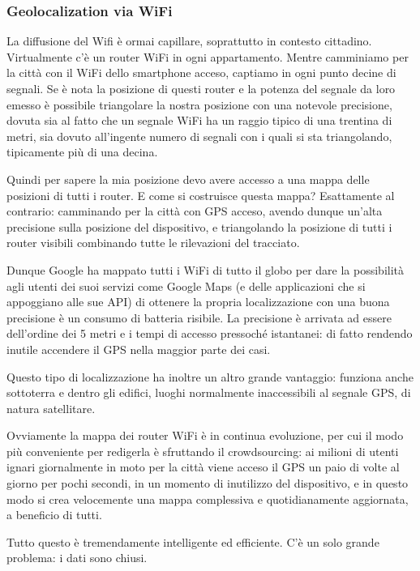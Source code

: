 \subsubsection*{Geolocalization via WiFi}
La diffusione del Wifi è ormai capillare, soprattutto in contesto cittadino. Virtualmente c'è un router WiFi in ogni appartamento. Mentre camminiamo per la città con il WiFi dello smartphone acceso, captiamo in ogni punto decine di segnali. Se è nota la posizione di questi router e la potenza del segnale da loro emesso è possibile triangolare la nostra posizione con una notevole precisione, dovuta sia al fatto che un segnale WiFi ha un raggio tipico di una trentina di metri, sia dovuto all'ingente numero di segnali con i quali si sta triangolando, tipicamente più di una decina.

Quindi per sapere la mia posizione devo avere accesso a una mappa delle posizioni di tutti i router. E come si costruisce questa mappa? Esattamente al contrario: camminando per la città con GPS acceso, avendo dunque un'alta precisione sulla posizione del dispositivo, e triangolando la posizione di tutti i router visibili combinando tutte le rilevazioni del tracciato.

Dunque Google ha mappato tutti i WiFi di tutto il globo per dare la possibilità agli utenti dei suoi servizi come Google Maps (e delle applicazioni che si appoggiano alle sue API) di ottenere la propria localizzazione con una buona precisione è un consumo di batteria risibile. La precisione è arrivata ad essere dell'ordine dei 5 metri e i tempi di accesso pressoché istantanei: di fatto rendendo inutile accendere il GPS nella maggior parte dei casi.

Questo tipo di localizzazione ha inoltre un altro grande vantaggio: funziona anche sottoterra e dentro gli edifici, luoghi normalmente inaccessibili al segnale GPS, di natura satellitare.

Ovviamente la mappa dei router WiFi è in continua evoluzione, per cui il modo più conveniente per redigerla è sfruttando il crowdsourcing: ai milioni di utenti ignari giornalmente in moto per la città viene acceso il GPS un paio di volte al giorno per pochi secondi, in un momento di inutilizzo del dispositivo, e in questo modo si crea velocemente una mappa complessiva e quotidianamente aggiornata, a beneficio di tutti.

Tutto questo è tremendamente intelligente ed efficiente. C'è un solo grande problema: i dati sono chiusi.

